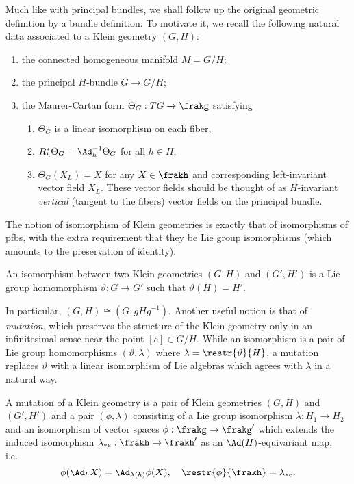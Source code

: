 Much like with principal bundles, we shall follow up the original geometric definition by a bundle definition. To motivate it, we recall the following natural data associated to a Klein geometry $(G,H)$:
\begin{enumerate}[label=(\alph*)]
    \item the connected homogeneous manifold $M=G\slash H$;
    \item the principal $H$-bundle $G\to G\slash H$;
    \item the Maurer-Cartan form $\Theta_G:TG\to \frakg$ satisfying
    \begin{enumerate}[label=(\roman*)]
        \item $\Theta_G$ is a linear isomorphism on each fiber,
        \item $R_h^\ast \Theta_G=\Ad_h^{-1}\Theta_G$ for all $h\in H$,
        \item $\Theta_G(X_L)=X$ for any $X\in \frakh$ and corresponding left-invariant vector field $X_L$. These vector fields should be thought of as $H$-invariant \emph{vertical} (tangent to the fibers) vector fields on the principal bundle.
    \end{enumerate}
\end{enumerate}

The notion of isomorphism of Klein geometries is exactly that of isomorphisms of \glspl{pfb}, with the extra requirement that they be Lie group isomorphisms (which amounts to the preservation of identity).



\begin{defn}
    An isomorphism between two Klein geometries $(G,H)$ and $(G',H')$ is a Lie group homomorphism $\vartheta:G\to G'$ such that $\vartheta(H)=H'$.
\end{defn}

In particular, $(G,H)\cong (G,gHg^{-1})$. Another useful notion is that of \emph{mutation}, which preserves  the structure of the Klein geometry only in an infinitesimal sense near the point $[e]\in G\slash H$. While an isomorphism is a pair of Lie group homomorphisms $(\vartheta,\lambda)$ where $\lambda=\restr{\vartheta}{H}$, a mutation replaces $\vartheta$ with a linear isomorphism of Lie algebras which agrees with $\lambda$ in a natural way.

\begin{defn}
    A mutation of a Klein geometry is a pair of Klein geometries $(G,H)$ and $(G',H')$ and a pair $(\phi,\lambda)$ consisting of a Lie group isomorphism $\lambda:H_1\to H_2$ and an isomorphism of vector spaces $\phi:\frakg\to \frakg'$ which extends the induced isomorphism $\lambda_{\ast e}:\frakh\to\frakh'$ as an $\Ad(H)$-equivariant map, i.e.\ 
    \[\phi(\Ad_h X)=\Ad_{\lambda(h)}\phi(X), \quad \restr{\phi}{\frakh}=\lambda_{\ast e}.\]
\end{defn}



